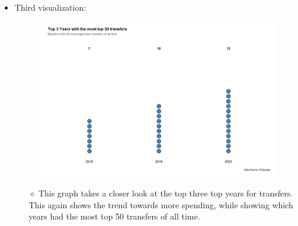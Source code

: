 \documentclass[12pt,letterpaper]{article}
\begin{document}
\begin{itemize}
    \item Third visualization:
        \begin{figure}[h!]  
            \centering
            \includegraphics[width=1\textwidth]{PS6C_Williams.png}
        \end{figure}
            \begin{itemize}
            \item[$\diamond$] This graph takes a closer look at the top three top years for transfers. This again shows the trend towards more spending, while showing which years had the most top 50 transfers of all time. 
             \end{itemize}
\end{itemize}
\end{document}
